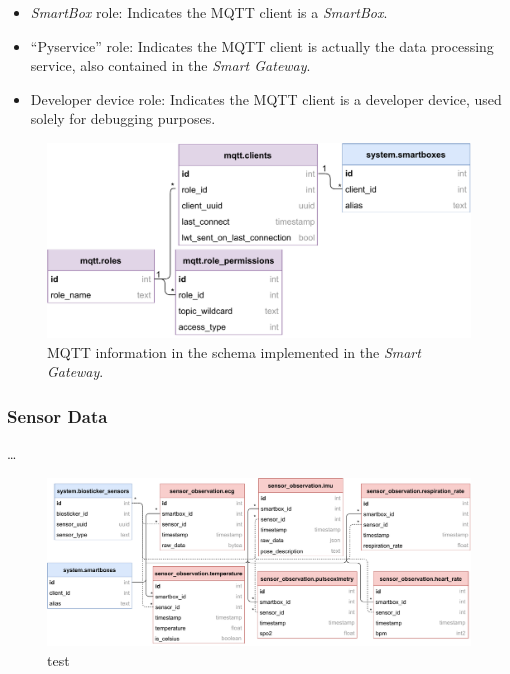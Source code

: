 \begin{itemize}
    \item \textit{SmartBox} role: Indicates the \acs{MQTT} client is a \textit{SmartBox}.
    \item ``Pyservice'' role: Indicates the \acs{MQTT} client is actually the data processing service, also contained in the \textit{Smart Gateway}.
    \item Developer device role: Indicates the \acs{MQTT} client is a developer device, used solely for debugging purposes.
\end{itemize}

\begin{figure}[H]
    \centering
    \includegraphics[width=\linewidth]{images/database-schema-mqtt.pdf}
    \caption[\acs{MQTT} information in the schema implemented in the \textit{Smart Gateway}.]{\acs{MQTT} information in the schema implemented in the \textit{Smart Gateway}.}
    \label{fig:wow-dbschema-mqtt}
\end{figure}

\subsubsection{Sensor Data}
\dots 

\begin{figure}[H]
    \centering
    \includegraphics[width=\linewidth]{images/database-schema-sensordata.pdf}
    \caption[test]{test}
    \label{fig:wow-dbschema-sensors}
\end{figure}


